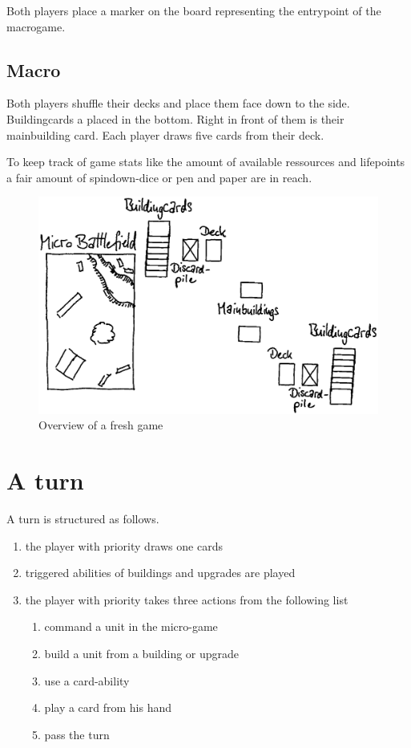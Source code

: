 \documentclass[a5paper,pagesize,10pt,bibtotoc,pointlessnumbers,
normalheadings,DIV=9,twoside=false]{scrbook}
\begin{document}
Both players place a marker on the board representing the entrypoint of the macrogame.

\subsection{Macro}
Both players shuffle their decks and place them face down to the side. Buildingcards a placed in the bottom. Right in front of them is their mainbuilding card. Each player draws five cards from their deck.

To keep track of game stats like the amount of available ressources and lifepoints a fair amount of spindown-dice or pen and paper are in reach.

\begin{figure}[t]
\includegraphics[scale=0.25]{Boardoverview}
\centering
\caption{Overview of a fresh game}
\end{figure}

\section{A turn}
A turn is structured as follows.

\begin{enumerate}
\item the player with priority draws one cards
\item triggered abilities of buildings and upgrades are played
\item the player with priority takes three actions from the following list
\begin{enumerate}
\item command a unit in the micro-game
\item build a unit from a building or upgrade
\item use a card-ability
\item play a card from his hand
\item pass the turn
\end{enumerate}
\end{enumerate}
\end{document}
